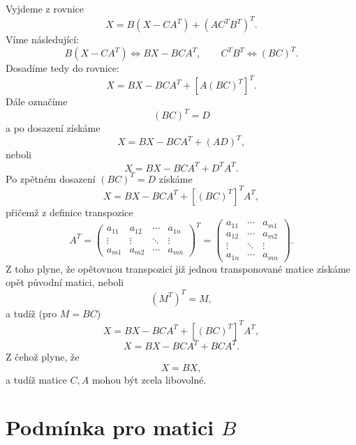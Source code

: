 \documentclass[12pt,a4paper]{article}
\begin{document}
\medskip
Vyjdeme z rovnice
\[
X = B\left(X - CA^{T}\right) + \left(AC^{T}B^{T}\right)^{T}.
\]
Víme následující:
\[
B\left(X - CA^{T}\right) \iff BX - BCA^{T},
\qquad
C^{T}B^{T} \iff (BC)^{T}.
\]
Dosadíme tedy do rovnice:
\[
X = BX - BCA^{T} + \left[A(BC)^{T}\right]^{T}.
\]
Dále označíme
\[
(BC)^{T} = D
\]
a po dosazení získáme
\[
X = BX - BCA^{T} + (AD)^{T},
\]
neboli
\[
X = BX - BCA^{T} + D^{T}A^{T}.
\]
Po zpětném dosazení $(BC)^{T}=D$ získáme
\[
X = BX - BCA^{T} + \left[(BC)^{T}\right]^{T}A^{T},
\]
přičemž z definice transpozice
\[
A^{T} =
\begin{pmatrix}
a_{11} & a_{12} & \cdots & a_{1n}\\
\vdots & \vdots & \ddots & \vdots\\
a_{m1} & a_{m2} & \cdots & a_{mn}
\end{pmatrix}^{T}
=
\begin{pmatrix}
a_{11} & \cdots & a_{m1}\\
a_{12} & \cdots & a_{m2}\\
\vdots & \ddots & \vdots\\
a_{1n} & \cdots & a_{mn}
\end{pmatrix}.
\]
Z toho plyne, že opětovnou transpozicí již jednou transponované matice získáme opět původní matici, neboli
\[
\left(M^{T}\right)^{T} = M,
\]
a tudíž (pro $M = BC$)
\[
X = BX - BCA^{T} + \left[(BC)^{T}\right]^{T}A^{T},
\]
\[
X = BX - BCA^{T} + BCA^{T}.
\]
Z čehož plyne, že
\[
X = BX,
\]
a tudíž matice $C, A$ mohou být zcela libovolné.

\section*{Podmínka pro matici $B$}
\end{document}
